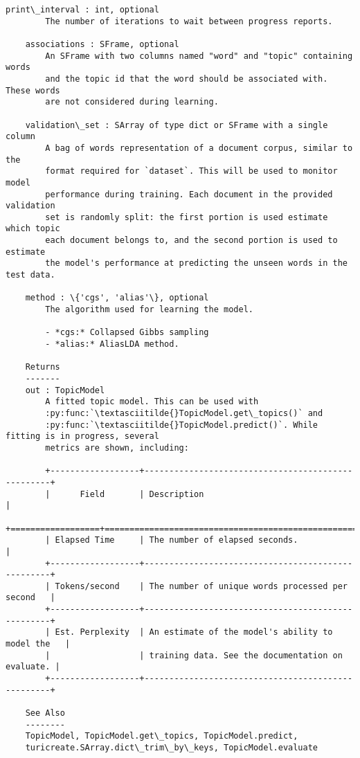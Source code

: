 \documentclass[11pt]{ctexart}
\begin{document}
\begin{Verbatim}[commandchars=\\\{\}]
    print\_interval : int, optional
        The number of iterations to wait between progress reports.
    
    associations : SFrame, optional
        An SFrame with two columns named "word" and "topic" containing words
        and the topic id that the word should be associated with. These words
        are not considered during learning.
    
    validation\_set : SArray of type dict or SFrame with a single column
        A bag of words representation of a document corpus, similar to the
        format required for `dataset`. This will be used to monitor model
        performance during training. Each document in the provided validation
        set is randomly split: the first portion is used estimate which topic
        each document belongs to, and the second portion is used to estimate
        the model's performance at predicting the unseen words in the test data.
    
    method : \{'cgs', 'alias'\}, optional
        The algorithm used for learning the model.
    
        - *cgs:* Collapsed Gibbs sampling
        - *alias:* AliasLDA method.
    
    Returns
    -------
    out : TopicModel
        A fitted topic model. This can be used with
        :py:func:`\textasciitilde{}TopicModel.get\_topics()` and
        :py:func:`\textasciitilde{}TopicModel.predict()`. While fitting is in progress, several
        metrics are shown, including:
    
        +------------------+---------------------------------------------------+
        |      Field       | Description                                       |
        +==================+===================================================+
        | Elapsed Time     | The number of elapsed seconds.                    |
        +------------------+---------------------------------------------------+
        | Tokens/second    | The number of unique words processed per second   |
        +------------------+---------------------------------------------------+
        | Est. Perplexity  | An estimate of the model's ability to model the   |
        |                  | training data. See the documentation on evaluate. |
        +------------------+---------------------------------------------------+
    
    See Also
    --------
    TopicModel, TopicModel.get\_topics, TopicModel.predict,
    turicreate.SArray.dict\_trim\_by\_keys, TopicModel.evaluate
    

\end{Verbatim}
\end{document}
